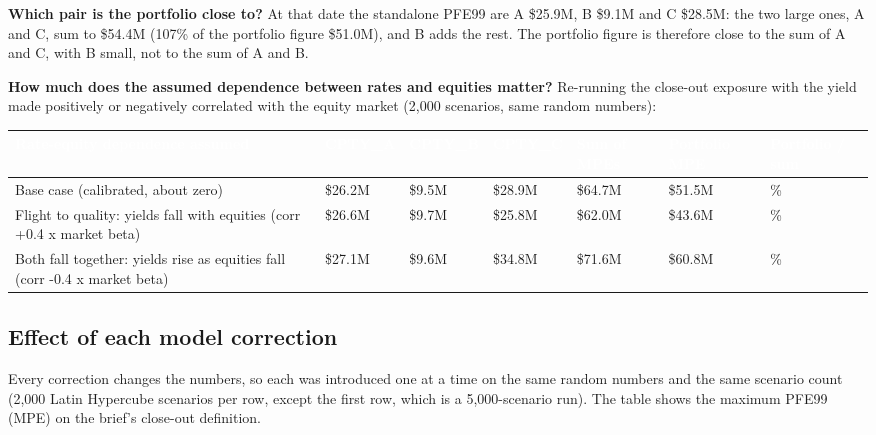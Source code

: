 \documentclass[11pt,letterpaper]{article}
\begin{document}
\textbf{Which pair is the portfolio close to?} At that date the standalone PFE99 are A \$25.9M, B \$9.1M and C \$28.5M: the two large ones, A and C, sum to \$54.4M (107\% of the portfolio figure \$51.0M), and B adds the rest. The portfolio figure is therefore close to the sum of A and C, with B small, not to the sum of A and B.

\textbf{How much does the assumed dependence between rates and equities matter?} Re-running the close-out exposure with the yield made positively or negatively correlated with the equity market (2,000 scenarios, same random numbers):

{\scriptsize\setlength{\LTpre}{4pt}\setlength{\LTpost}{6pt}
\begin{longtable}{>{\raggedright\arraybackslash}p{}>{\raggedright\arraybackslash}p{}>{\raggedright\arraybackslash}p{}>{\raggedright\arraybackslash}p{}>{\raggedright\arraybackslash}p{}>{\raggedright\arraybackslash}p{}>{\raggedright\arraybackslash}p{}}
\toprule
\rowcolor{navy}\textbf{\textcolor{white}{Rate-equity dependence assumed}} & \textbf{\textcolor{white}{CPTY\_A}} & \textbf{\textcolor{white}{CPTY\_B}} & \textbf{\textcolor{white}{CPTY\_C}} & \textbf{\textcolor{white}{Sum of MPEs}} & \textbf{\textcolor{white}{Portfolio MPE}} & \textbf{\textcolor{white}{Portfolio / sum}} \\
\endhead
Base case (calibrated, about zero) & \$26.2M & \$9.5M & \$28.9M & \$64.7M & \$51.5M & 80\% \\
\rowcolor{gray!9}Flight to quality: yields fall with equities (corr +0.4 x market beta) & \$26.6M & \$9.7M & \$25.8M & \$62.0M & \$43.6M & 70\% \\
Both fall together: yields rise as equities fall (corr -0.4 x market beta) & \$27.1M & \$9.6M & \$34.8M & \$71.6M & \$60.8M & 85\% \\
\bottomrule
\end{longtable}}

\subsection{Effect of each model correction}
Every correction changes the numbers, so each was introduced one at a time on the same random numbers and the same scenario count (2,000 Latin Hypercube scenarios per row, except the first row, which is a 5,000-scenario run). The table shows the maximum PFE99 (MPE) on the brief's close-out definition.
\end{document}
